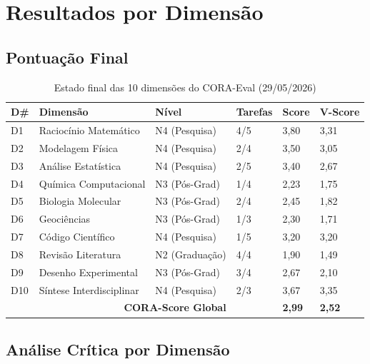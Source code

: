 \documentclass[12pt,a4paper,oneside]{article}
\begin{document}
\section{Resultados por Dimensão}

\subsection{Pontuação Final}

\begin{table}[H]
\centering
\caption{Estado final das 10 dimensões do CORA-Eval (29/05/2026)}
\label{tab:final}
\begin{tabular}{p{}p{}p{}p{}p{}p{}}
\toprule
\textbf{D\#} & \textbf{Dimensão} & \textbf{Nível} & \textbf{Tarefas} & \textbf{Score} & \textbf{V-Score} \\
\midrule
D1 & Raciocínio Matemático & N4 (Pesquisa) & 4/5 & 3,80 & 3,31 \\
D2 & Modelagem Física & N4 (Pesquisa) & 2/4 & 3,50 & 3,05 \\
D3 & Análise Estatística & N4 (Pesquisa) & 2/5 & 3,40 & 2,67 \\
D4 & Química Computacional & N3 (Pós-Grad) & 1/4 & 2,23 & 1,75 \\
D5 & Biologia Molecular & N3 (Pós-Grad) & 2/4 & 2,45 & 1,82 \\
D6 & Geociências & N3 (Pós-Grad) & 1/3 & 2,30 & 1,71 \\
D7 & Código Científico & N4 (Pesquisa) & 1/5 & 3,20 & 3,20 \\
D8 & Revisão Literatura & N2 (Graduação) & 4/4 & 1,90 & 1,49 \\
D9 & Desenho Experimental & N3 (Pós-Grad) & 3/4 & 2,67 & 2,10 \\
D10 & Síntese Interdisciplinar & N4 (Pesquisa) & 2/3 & 3,67 & 3,35 \\
\midrule
\multicolumn{3}{r}{\textbf{CORA-Score Global}} & & \textbf{2,99} & \textbf{2,52} \\
\bottomrule
\end{tabular}
\end{table}

\subsection{Análise Crítica por Dimensão}
\end{document}
